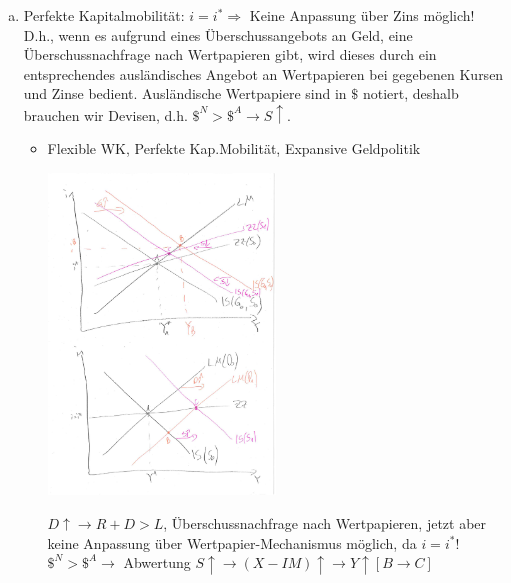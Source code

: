 \documentclass{scrartcl}
\begin{document}
\begin{enumerate}[a)]
\item Perfekte Kapitalmobilit\"{a}t: $i=i^* \Rightarrow$ Keine Anpassung \"{u}ber Zins m\"{o}glich! D.h., wenn es aufgrund eines \"{U}berschussangebots an Geld, eine \"{U}berschussnachfrage nach Wertpapieren gibt, wird dieses durch ein entsprechendes ausl\"{a}ndisches Angebot an Wertpapieren bei gegebenen Kursen und Zinse bedient. Ausl\"{a}ndische Wertpapiere sind in $\$$ notiert, deshalb brauchen wir Devisen, d.h. $\$^{N} > \$^{A} \rightarrow S\uparrow$.
\begin{itemize}
  \item Flexible WK, Perfekte Kap.Mobilit\"{a}t, Expansive Geldpolitik
    \begin{center}
      \includegraphics[width=0.5\textwidth]{Bilder/MF5.pdf}
    \end{center}
    $D\uparrow \rightarrow R+D > L$, \"{U}berschussnachfrage nach Wertpapieren, jetzt aber keine Anpassung \"{u}ber Wertpapier-Mechanismus m\"{o}glich, da $i=i^*$! $\$^{N}>\$^{A} \rightarrow $ Abwertung $S\uparrow \rightarrow (X-IM)\uparrow \rightarrow Y \uparrow [B\rightarrow C]$


\end{itemize}
\end{enumerate}
\end{document}
